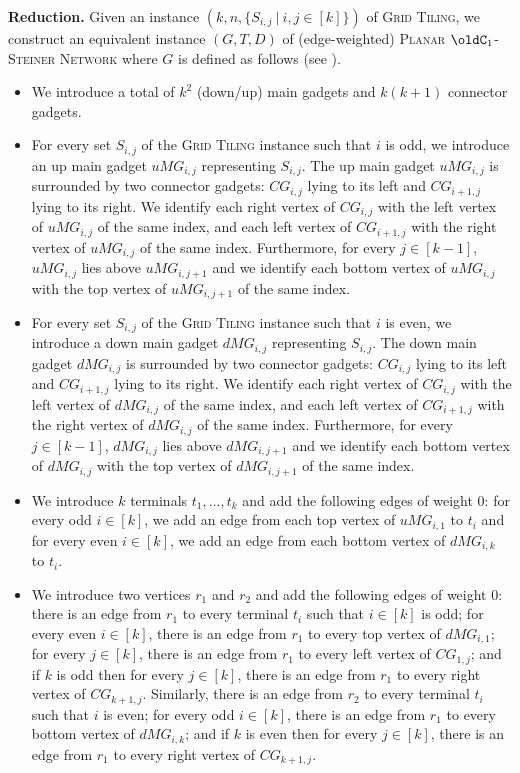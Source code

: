\noindent
\textbf{Reduction.} Given an instance $(k,n,\{S_{i,j}~|~i,j \in [k]\})$ of \textsc{Grid Tiling}, we construct an equivalent instance $(G,T,D)$ of (edge-weighted) \textsc{Planar $\oldC_1$-Steiner Network} where $G$ is defined as follows (see ). 
\begin{itemize}
\item We introduce a total of $k^2$ (down/up) main gadgets and $k(k+1)$ connector gadgets.
\item For every set $S_{i,j}$ of the \textsc{Grid Tiling} instance such that $i$ is odd, we introduce an up main gadget $uMG_{i,j}$ representing $S_{i,j}$. The up main gadget $uMG_{i,j}$ is surrounded by two connector gadgets: $CG_{i,j}$ lying to its left and $CG_{i+1,j}$ lying to its right. We identify each right vertex of $CG_{i,j}$ with the left vertex of $uMG_{i,j}$ of the same index, and each left vertex of $CG_{i+1,j}$ with the right vertex of $uMG_{i,j}$ of the same index. Furthermore, for every $j \in [k-1]$, $uMG_{i,j}$ lies above $uMG_{i,j+1}$ and we identify each bottom vertex of $uMG_{i,j}$ with the top vertex of $uMG_{i,j+1}$ of the same index.
\item For every set $S_{i,j}$ of the \textsc{Grid Tiling} instance such that $i$ is even, we introduce a down main gadget $dMG_{i,j}$ representing $S_{i,j}$. The down main gadget $dMG_{i,j}$ is surrounded by two connector gadgets: $CG_{i,j}$ lying to its left and $CG_{i+1,j}$ lying to its right. We identify each right vertex of $CG_{i,j}$ with the left vertex of $dMG_{i,j}$ of the same index, and each left vertex of $CG_{i+1,j}$ with the right vertex of $dMG_{i,j}$ of the same index. Furthermore, for every $j \in [k-1]$, $dMG_{i,j}$ lies above $dMG_{i,j+1}$ and we identify each bottom vertex of $dMG_{i,j}$ with the top vertex of $dMG_{i,j+1}$ of the same index.
\item We introduce $k$ terminals $t_1,\ldots,t_k$ and add the following edges of weight 0: for every odd $i \in [k]$, we add an edge from each top vertex of $uMG_{i,1}$ to $t_i$ and for every even $i \in [k]$, we add an edge from each bottom vertex of $dMG_{i,k}$ to $t_i$.
\item We introduce two vertices $r_1$ and $r_2$ and add the following edges of weight 0: there is an edge from $r_1$ to every terminal $t_i$ such that $i \in [k]$ is odd; for every even $i \in [k]$, there is an edge from $r_1$ to every top vertex of $dMG_{i,1}$; for every $j \in [k]$, there is an edge from $r_1$ to every left vertex of $CG_{1,j}$; and if $k$ is odd then for every $j \in [k]$, there is an edge from $r_1$ to every right vertex of $CG_{k+1,j}$. Similarly, there is an edge from $r_2$ to every terminal $t_i$ such that $i$ is even; for every odd $i \in [k]$, there is an edge from $r_1$ to every bottom vertex of $dMG_{i,k}$; and if $k$ is even then for every $j \in [k]$, there is an edge from $r_1$ to every right vertex of $CG_{k+1,j}$.
\end{itemize} 
